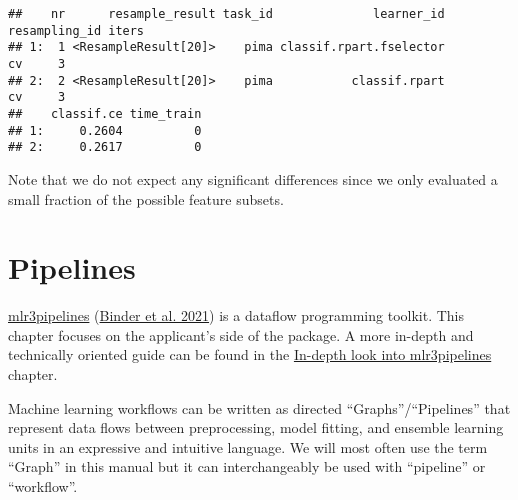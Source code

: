 \documentclass[
]{scrbook}
\newenvironment{Shaded}{\begin{snugshade}}{\end{snugshade}}
\newcommand{\AttributeTok}[1]{\textcolor[rgb]{0.77,0.63,0.00}{#1}}
\newcommand{\ConstantTok}[1]{\textcolor[rgb]{0.00,0.00,0.00}{#1}}
\newcommand{\DecValTok}[1]{\textcolor[rgb]{0.00,0.00,0.81}{#1}}
\newcommand{\FunctionTok}[1]{\textcolor[rgb]{0.00,0.00,0.00}{#1}}
\newcommand{\NormalTok}[1]{#1}
\newcommand{\OtherTok}[1]{\textcolor[rgb]{0.56,0.35,0.01}{#1}}
\newcommand{\SpecialCharTok}[1]{\textcolor[rgb]{0.00,0.00,0.00}{#1}}
\newcommand{\StringTok}[1]{\textcolor[rgb]{0.31,0.60,0.02}{#1}}
\renewenvironment{Shaded} {\begin{snugshade}\small} {\end{snugshade}}
\begin{document}
\begin{Shaded}
\end{Shaded}

\begin{verbatim}
##    nr      resample_result task_id              learner_id resampling_id iters
## 1:  1 <ResampleResult[20]>    pima classif.rpart.fselector            cv     3
## 2:  2 <ResampleResult[20]>    pima           classif.rpart            cv     3
##    classif.ce time_train
## 1:     0.2604          0
## 2:     0.2617          0
\end{verbatim}

Note that we do not expect any significant differences since we only evaluated a small fraction of the possible feature subsets.

\hypertarget{pipelines}{%
\chapter{Pipelines}\label{pipelines}}

\href{https://mlr3pipelines.mlr-org.com}{mlr3pipelines} (\protect\hyperlink{ref-mlr3pipelines}{Binder et al. 2021}) is a dataflow programming toolkit.
This chapter focuses on the applicant's side of the package.
A more in-depth and technically oriented guide can be found in the \protect\hyperlink{in-depth-pipelines}{In-depth look into mlr3pipelines} chapter.

Machine learning workflows can be written as directed ``Graphs''/``Pipelines'' that represent data flows between preprocessing, model fitting, and ensemble learning units in an expressive and intuitive language.
We will most often use the term ``Graph'' in this manual but it can interchangeably be used with ``pipeline'' or ``workflow''.
\end{document}
